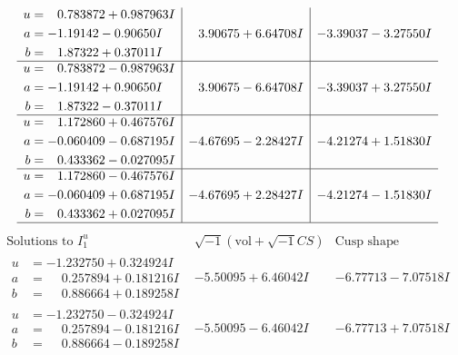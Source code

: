 \documentclass[1p]{elsarticle_modified}
\theoremstyle{definition}
\newcommand{\I}{\sqrt{-1}}
\begin{document}
$$\begin{array}{c|c|c}
\begin{aligned}
u &= \phantom{-}0.783872 + 0.987963 I \\
a &= -1.19142 - 0.90650 I \\
b &= \phantom{-}1.87322 + 0.37011 I\end{aligned}
 & \phantom{-}3.90675 + 6.64708 I & -3.39037 - 3.27550 I \\ \hline\begin{aligned}
u &= \phantom{-}0.783872 - 0.987963 I \\
a &= -1.19142 + 0.90650 I \\
b &= \phantom{-}1.87322 - 0.37011 I\end{aligned}
 & \phantom{-}3.90675 - 6.64708 I & -3.39037 + 3.27550 I \\ \hline\begin{aligned}
u &= \phantom{-}1.172860 + 0.467576 I \\
a &= -0.060409 - 0.687195 I \\
b &= \phantom{-}0.433362 - 0.027095 I\end{aligned}
 & -4.67695 - 2.28427 I & -4.21274 + 1.51830 I \\ \hline\begin{aligned}
u &= \phantom{-}1.172860 - 0.467576 I \\
a &= -0.060409 + 0.687195 I \\
b &= \phantom{-}0.433362 + 0.027095 I\end{aligned}
 & -4.67695 + 2.28427 I & -4.21274 - 1.51830 I\\
 \hline 
 \end{array}$$\newpage$$\begin{array}{c|c|c}  
\text{Solutions to }I^u_{1}& \I (\text{vol} + \sqrt{-1}CS) & \text{Cusp shape}\\
 \hline 
\begin{aligned}
u &= -1.232750 + 0.324924 I \\
a &= \phantom{-}0.257894 + 0.181216 I \\
b &= \phantom{-}0.886664 + 0.189258 I\end{aligned}
 & -5.50095 + 6.46042 I & -6.77713 - 7.07518 I \\ \hline\begin{aligned}
u &= -1.232750 - 0.324924 I \\
a &= \phantom{-}0.257894 - 0.181216 I \\
b &= \phantom{-}0.886664 - 0.189258 I\end{aligned}
 & -5.50095 - 6.46042 I & -6.77713 + 7.07518 I \\ \hline\begin{aligned}

\end{aligned}
\end{array}$$
\end{document}
